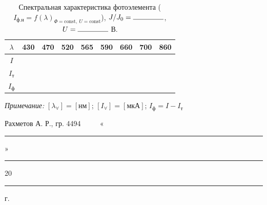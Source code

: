 \newpage
\thispagestyle{empty}
\begin{table}[H]
    \centering
    \caption{Спектральная характеристика фотоэлемента ($I_\text{ф.н} = f(\lambda)_{\Phi=\text{const},~U=\text{const}}$), $J/J_0 = \rule{1.5cm}{0.4pt}$, $U = \rule{1.5cm}{0.4pt}$ В.}
    \label{tab:protocol_spectral}
    \begin{tabularx}{\linewidth}{|c|*{8}{C|}}
        \hline
        $\lambda$    & 430 & 470 & 520 & 565 & 590 & 660 & 700 & 860 \\
        \hline \hline
        $I$          &     &     &     &     &     &     &     &     \\
        \hline
        $I_\text{т}$ &     &     &     &     &     &     &     &     \\
        \hline
        $I_\text{ф}$ &     &     &     &     &     &     &     &     \\
        \hline
    \end{tabularx}
\end{table}

\textit{Примечание: } $[\lambda_\forall] = [\text{нм}]$; \hfill $[I_\forall] = [\text{мкА}]$; \hfill $I_\text{ф} = I - I_\text{т}$

\vfill
\noindent
Рахметов А. Р., гр. 4494 ~~\hrulefill~~ «\rule{1cm}{0.4pt}» \rule{3cm}{0.4pt} 20\rule{0.75cm}{0.4pt} г.